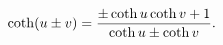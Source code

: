 \[\mathop{\coth\/}\nolimits\!\left(u\pm v\right)=\frac{\pm\mathop{\coth\/}%
\nolimits u\mathop{\coth\/}\nolimits v+1}{\mathop{\coth\/}\nolimits u\pm%
\mathop{\coth\/}\nolimits v}.\]
